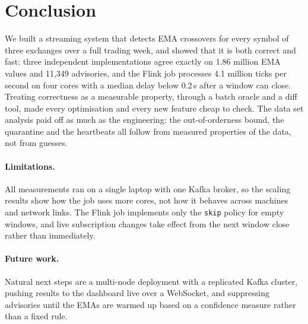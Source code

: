 \section{Conclusion}

We built a streaming system that detects EMA crossovers for every symbol of three exchanges over a full trading week, and showed that it is both correct and fast: three independent implementations agree exactly on 1.86 million EMA values and 11,349 advisories, and the Flink job processes 4.1 million ticks per second on four cores with a median delay below 0.2\,s after a window can close.
Treating correctness as a measurable property, through a batch oracle and a diff tool, made every optimisation and every new feature cheap to check.
The data set analysis paid off as much as the engineering: the out-of-orderness bound, the quarantine and the heartbeats all follow from measured properties of the data, not from guesses.

\paragraph{Limitations.}
All measurements ran on a single laptop with one Kafka broker, so the scaling results show how the job uses more cores, not how it behaves across machines and network links.
The Flink job implements only the \texttt{skip} policy for empty windows, and live subscription changes take effect from the next window close rather than immediately.

\paragraph{Future work.}
Natural next steps are a multi-node deployment with a replicated Kafka cluster, pushing results to the dashboard live over a WebSocket, and suppressing advisories until the EMAs are warmed up based on a confidence measure rather than a fixed rule.
